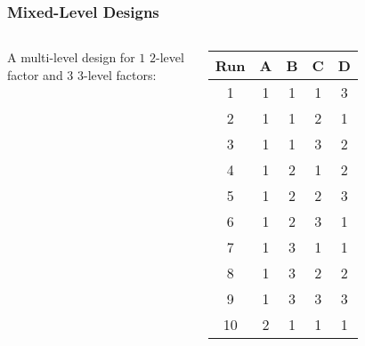 \documentclass[10pt, compress, aspectratio=169, xcolor={table,usenames,dvipsnames}]{beamer}
\begin{document}
\begin{frame}
    \frametitle{Mixed-Level Designs}
    \begin{columns}[c]

            \vspace{.1cm}

            A \alert{multi-level} design for $1$ \alert{$2$-level factor}
            and $3$ \alert{$3$-level factors}:

            \vspace{-.3cm}

            \begin{table}[]
                \scriptsize
                \centering
                \begin{tabular}{@{}ccccc@{}}
                    \toprule
                    Run & A & B & C & D \\ \midrule
                    \cellcolor{gray!18}1 & \cellcolor{green!25}1 & \cellcolor{green!25}1 & \cellcolor{green!25}1 & \cellcolor{red!25}3 \\
                    \cellcolor{gray!18}2 & \cellcolor{green!25}1 & \cellcolor{green!25}1 & \cellcolor{cyan!25}2 & \cellcolor{green!25}1 \\
                    \cellcolor{gray!18}3 & \cellcolor{green!25}1 & \cellcolor{green!25}1 & \cellcolor{red!25}3 & \cellcolor{cyan!25}2 \\
                    \cellcolor{gray!18}4 & \cellcolor{green!25}1 & \cellcolor{cyan!25}2 & \cellcolor{green!25}1 & \cellcolor{cyan!25}2 \\
                    \cellcolor{gray!18}5 & \cellcolor{green!25}1 & \cellcolor{cyan!25}2 & \cellcolor{cyan!25}2 & \cellcolor{red!25}3 \\
                    \cellcolor{gray!18}6 & \cellcolor{green!25}1 & \cellcolor{cyan!25}2 & \cellcolor{red!25}3 & \cellcolor{green!25}1 \\
                    \cellcolor{gray!18}7 & \cellcolor{green!25}1 & \cellcolor{red!25}3 & \cellcolor{green!25}1 & \cellcolor{green!25}1 \\
                    \cellcolor{gray!18}8 & \cellcolor{green!25}1 & \cellcolor{red!25}3 & \cellcolor{cyan!25}2 & \cellcolor{cyan!25}2 \\
                    \cellcolor{gray!18}9 & \cellcolor{green!25}1 & \cellcolor{red!25}3 & \cellcolor{red!25}3 & \cellcolor{red!25}3 \\
                    \cellcolor{gray!18}10 & \cellcolor{cyan!25}2 & \cellcolor{green!25}1 & \cellcolor{green!25}1 & \cellcolor{green!25}1 \\

\end{tabular}
\end{table}
\end{columns}
\end{frame}
\end{document}
